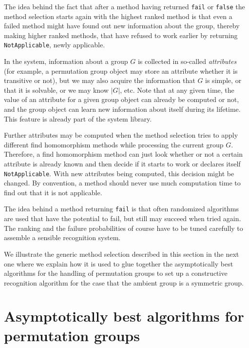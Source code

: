 The idea behind the fact that after a method having returned
\texttt{fail} or \texttt{false} the method selection starts again
with the highest ranked method is that even a failed method might
have found out new information about the group, thereby making
higher ranked methods, that have refused to work earlier by
returning \texttt{NotApplicable}, newly applicable.

In the {\GAP} system, information about a group $G$ is collected in
so-called {\em attributes} (for example,
a permutation group object may store an attribute whether it is transitive
or not), but we may also acquire the information that 
$G$ is simple, or that it is solvable, or we may know $|G|$, etc. 
Note that at any given time, the value of an attribute for a given group
object can already be computed or not, and the group object can learn new
information about itself during its lifetime. This feature is already
part of the {\GAP} system library. 

Further attributes may be
computed when the method selection tries to apply
different find homomorphism methods while processing the current group $G$.
Therefore, a find homomorphism method can just look whether or not
a certain attribute is already known and then decide if it starts
to work or declares itself \texttt{NotApplicable}. With new attributes
being computed, this decision might be changed. By convention, a method
should never use much computation time to find out that it is not
applicable.

The idea behind a method returning \texttt{fail} is that often
randomized algorithms are used that have the potential to fail,
but still may succeed when tried again. The ranking and the failure 
probabilities of course have to be tuned carefully to assemble
a sensible recognition system.

We illustrate the generic method selection described in this section
in the next one where we explain how it is used to glue together the
asymptotically best algorithms for the handling of permutation groups
to set up a constructive recognition algorithm for the case that the
ambient group is a symmetric group.

\section{Asymptotically best algorithms for permutation groups}
\label{permgrps}

